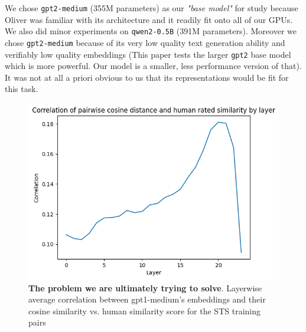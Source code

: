 \documentclass[14pt]{article}
\begin{document}
We chose \verb|gpt2-medium| (355M parameters) as our \textit{"base model"} for study because Oliver was familiar with its architecture and it readily fit onto all of our GPUs. We also did minor experiments on \verb|qwen2-0.5B| (391M parameters). Moreover we chose \verb|gpt2-medium| because of its very low quality text generation ability and verifiably low quality embeddings \cite{ethayarajh2019contextualcontextualizedwordrepresentations} (This paper tests the larger \verb|gpt2| base model which is more powerful. Our model is a smaller, less performance version of that). It was not at all a priori obvious to us that its representations would be fit for this task.

\begin{figure}[!htb]
    \centering
    \includegraphics[width=0.5\linewidth]{raw_cosine_sim.png}
    \caption{\textbf{The problem we are ultimately trying to solve}. Layerwise average correlation between gpt1-medium's embeddings and their cosine similarity vs. human similarity score for the STS training pairs}
    \label{fig:raw-corr}
\end{figure}
\end{document}
